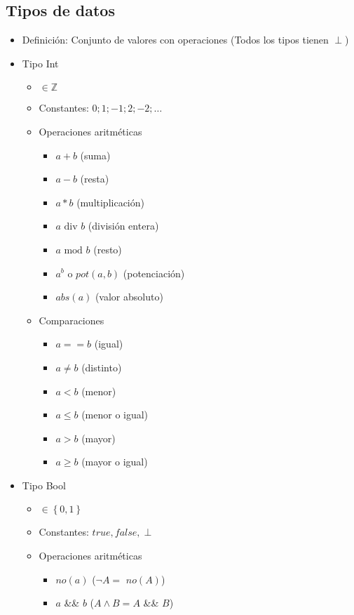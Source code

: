 \documentclass[a4paper,10pt]{article}
\begin{document}
\subsection{Tipos de datos}
	\begin{itemize}
		\item Definición: Conjunto de valores con operaciones (Todos los tipos tienen $\perp$)
		\item Tipo Int
		\begin{itemize}
			\item $\in \mathbb{Z}$
			\item Constantes: $0;1;-1;2;-2;\dots$
			\item Operaciones aritméticas
			\begin{itemize}
				\item $a + b$ (suma)
				\item $a - b$ (resta)
				\item $a * b$ (multiplicación)
				\item $a \mbox{ div } b$ (división entera)
				\item $a \mbox{ mod } b$ (resto)
				\item $a^{b}$ o $pot(a,b)$ (potenciación)
				\item $abs(a)$ (valor absoluto)
			\end{itemize}
			\item Comparaciones
			\begin{itemize}
				\item $a == b$ (igual)
				\item $a \neq b$ (distinto)
				\item $a < b$ (menor)
				\item $a \leq b$ (menor o igual)
				\item $a > b$ (mayor)
				\item $a \geq b$ (mayor o igual)
			\end{itemize}
		\end{itemize}
		\item Tipo Bool
		\begin{itemize}
			\item $\in \left\lbrace 0, 1 \right\rbrace$
			\item Constantes: $true,false, \perp$
			\item Operaciones aritméticas
			\begin{itemize}
				\item $no(a)$ ($\neg A =$ $no(A)$)
				\item $a$ \&\& $b$ ($A \wedge B = A$ \&\& $B$)

\end{itemize}
\end{itemize}
\end{itemize}
\end{document}
